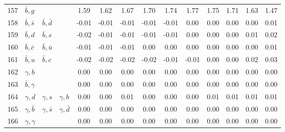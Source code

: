 \begin{tabularx}{\textwidth}{rXXX@{}S@{}S@{}S@{}S@{}S@{}S@{}S@{}S@{}S@{}S}
157 & $\bar b, g$      &                   &                  &  1.59 &  1.62 &  1.67 &  1.70 &  1.74 &  1.77 &  1.75 &  1.71 &  1.63 &  1.47 \\
158 & $\bar b, \bar s$ & $\bar b, \bar d$  &                  & -0.01 & -0.01 & -0.01 & -0.01 & -0.01 &  0.00 &  0.00 &  0.00 &  0.00 &  0.01 \\
159 & $\bar b, d$      & $\bar b, s$       &                  & -0.02 & -0.01 & -0.01 & -0.01 & -0.01 &  0.00 &  0.00 &  0.00 &  0.01 &  0.02 \\
160 & $\bar b, \bar c$ & $\bar b, \bar u$  &                  & -0.01 & -0.01 & -0.01 &  0.00 &  0.00 &  0.00 &  0.00 &  0.00 &  0.00 &  0.01 \\
161 & $\bar b, u$      & $\bar b, c$       &                  & -0.02 & -0.02 & -0.02 & -0.02 & -0.01 & -0.01 &  0.00 &  0.00 &  0.02 &  0.03 \\
162 & $\gamma, b$      &                   &                  &  0.00 &  0.00 &  0.00 &  0.00 &  0.00 &  0.00 &  0.00 &  0.00 &  0.00 &  0.00 \\
163 & $\bar b, \gamma$ &                   &                  &  0.00 &  0.00 &  0.00 &  0.00 &  0.00 &  0.00 &  0.00 &  0.00 &  0.00 &  0.00 \\
164 & $\gamma,  d$     & $\gamma, s$       & $\gamma, b$      &  0.00 &  0.00 &  0.01 &  0.00 &  0.00 &  0.00 &  0.01 &  0.01 &  0.01 &  0.01 \\
165 & $\gamma, \bar b$ & $\gamma, \bar s$  & $\gamma, \bar d$ &  0.00 &  0.00 &  0.00 &  0.00 &  0.00 &  0.00 &  0.00 &  0.00 &  0.00 &  0.00 \\
166 & $\gamma, \gamma$ &                   &                  &  0.00 &  0.00 &  0.00 &  0.00 &  0.00 &  0.00 &  0.00 &  0.00 &  0.00 &  0.00 \\
\bottomrule
\end{tabularx}
